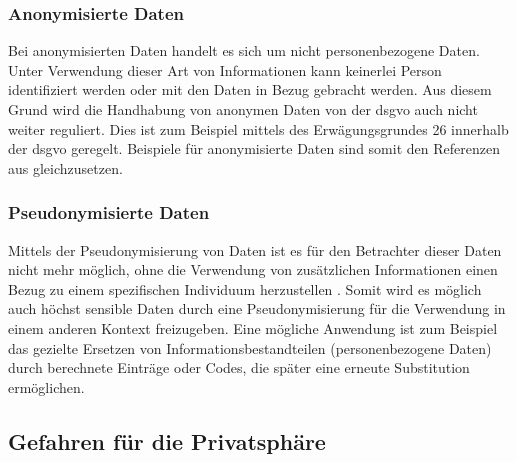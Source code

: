 \subsubsection{Anonymisierte Daten}
\label{sec:Grundlagen:ssec:Klassifikation von Daten:sssec:Anonymisierte Daten}

Bei anonymisierten Daten handelt es sich um nicht personenbezogene Daten. Unter Verwendung dieser Art von Informationen kann keinerlei Person identifiziert werden oder mit den Daten in Bezug gebracht werden. Aus diesem Grund wird die Handhabung von anonymen Daten von der \ac{dsgvo} auch nicht weiter reguliert. Dies ist zum Beispiel mittels des Erwägungsgrundes 26 \cite{DSGVOEg26} innerhalb der \ac{dsgvo} geregelt. Beispiele für anonymisierte Daten sind somit den Referenzen aus  gleichzusetzen.

\subsubsection{Pseudonymisierte Daten}
\label{sec:Grundlagen:ssec:Klassifikation von Daten:sssec:Pseudonymisierte Daten}

Mittels der Pseudonymisierung von Daten ist es für den Betrachter dieser Daten nicht mehr möglich, ohne die Verwendung von zusätzlichen Informationen einen Bezug zu einem spezifischen Individuum herzustellen \cite{DSGVOArt4}. Somit wird es möglich auch höchst sensible Daten durch eine Pseudonymisierung für die Verwendung in einem anderen Kontext freizugeben. Eine mögliche Anwendung ist zum Beispiel das gezielte Ersetzen von Informationsbestandteilen (personenbezogene Daten) durch berechnete Einträge oder Codes, die später eine erneute Substitution ermöglichen.

\subsection{Gefahren für die Privatsphäre}
\label{sec:Grundlagen:ssec:Gefahren für die Privatsphäre}


